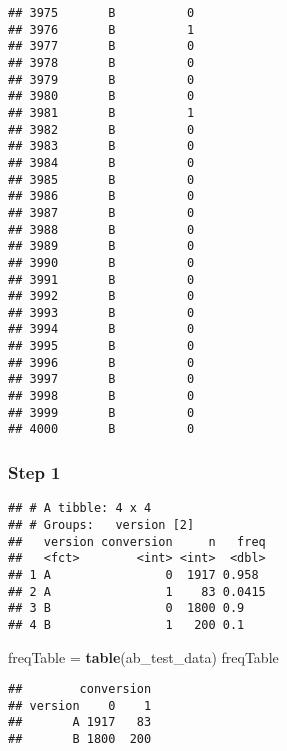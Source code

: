 \documentclass[]{article}
\newenvironment{Shaded}{\begin{snugshade}}{\end{snugshade}}
\newcommand{\KeywordTok}[1]{\textcolor[rgb]{0.13,0.29,0.53}{\textbf{#1}}}
\newcommand{\DataTypeTok}[1]{\textcolor[rgb]{0.13,0.29,0.53}{#1}}
\newcommand{\StringTok}[1]{\textcolor[rgb]{0.31,0.60,0.02}{#1}}
\newcommand{\OperatorTok}[1]{\textcolor[rgb]{0.81,0.36,0.00}{\textbf{#1}}}
\newcommand{\NormalTok}[1]{#1}
\begin{document}
\begin{verbatim}
## 3975       B          0
## 3976       B          1
## 3977       B          0
## 3978       B          0
## 3979       B          0
## 3980       B          0
## 3981       B          1
## 3982       B          0
## 3983       B          0
## 3984       B          0
## 3985       B          0
## 3986       B          0
## 3987       B          0
## 3988       B          0
## 3989       B          0
## 3990       B          0
## 3991       B          0
## 3992       B          0
## 3993       B          0
## 3994       B          0
## 3995       B          0
## 3996       B          0
## 3997       B          0
## 3998       B          0
## 3999       B          0
## 4000       B          0
\end{verbatim}

\subsubsection{Step 1}\label{step-1-2}

\begin{Shaded}
\end{Shaded}

\begin{verbatim}
## # A tibble: 4 x 4
## # Groups:   version [2]
##   version conversion     n   freq
##   <fct>        <int> <int>  <dbl>
## 1 A                0  1917 0.958 
## 2 A                1    83 0.0415
## 3 B                0  1800 0.9   
## 4 B                1   200 0.1
\end{verbatim}

\begin{Shaded}
\begin{Highlighting}[]
\NormalTok{freqTable =}\StringTok{ }\KeywordTok{table}\NormalTok{(ab_test_data)}
\NormalTok{freqTable}
\end{Highlighting}
\end{Shaded}

\begin{verbatim}
##        conversion
## version    0    1
##       A 1917   83
##       B 1800  200
\end{verbatim}
\end{document}
